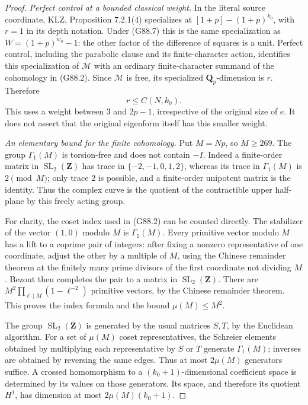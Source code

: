 \begin{proof}
\emph{Perfect control at a bounded classical weight.}
In the literal source coordinate, KLZ, Proposition 7.2.1(4)
specializes at
\([1+p]-(1+p)^{k_0}\), with \(r=1\) in its depth notation.
Under (G88.7) this is the same specialization as
\(W=(1+p)^{w_0}-1\): the other factor of the difference of
squares is a unit. Perfect control, including the parabolic
clause and its finite-character action, identifies this
specialization of \(\mathcal M\) with an ordinary
finite-character summand of the cohomology in (G88.2).
Since \(\mathcal M\) is free, its specialized
\(\mathbf Q_p\)-dimension is \(r\). Therefore
\[
 r\leq C(N,k_0).
 \tag{G88.13}
\]
This uses a weight between \(3\) and \(2p-1\), irrespective of
the original size of \(e\). It does not assert that the
original eigenform itself has this smaller weight.

\emph{An elementary bound for the finite cohomology.}
Put \(M=Np\), so \(M\geq269\).
The group \(\Gamma_1(M)\) is torsion-free and does not contain
\(-I\). Indeed a finite-order matrix in
\(\operatorname{SL}_2(\mathbf Z)\) has trace in
\(\{-2,-1,0,1,2\}\), whereas its trace in \(\Gamma_1(M)\) is
\(2\pmod M\); only trace \(2\) is possible, and a finite-order
unipotent matrix is the identity.
Thus the complex curve is the quotient of the contractible
upper half-plane by this freely acting group.

For clarity, the coset index used in (G88.2) can be counted
directly. The stabilizer of the vector \((1,0)\) modulo \(M\)
is \(\Gamma_1(M)\). Every primitive vector modulo \(M\) has
a lift to a coprime pair of integers: after fixing a nonzero
representative of one coordinate, adjust the other by a
multiple of \(M\), using the Chinese remainder theorem at the
finitely many prime divisors of the first coordinate not
dividing \(M\). Bezout then completes the pair to a matrix
in \(\operatorname{SL}_2(\mathbf Z)\).
There are \(M^2\prod_{\ell\mid M}(1-\ell^{-2})\) primitive
vectors, by the Chinese remainder theorem. This proves the
index formula and the bound \(\mu(M)\leq M^2\).

The group \(\operatorname{SL}_2(\mathbf Z)\) is generated by
the usual matrices \(S,T\), by the Euclidean algorithm.
For a set of \(\mu(M)\) coset representatives, the Schreier
elements obtained by multiplying each representative by
\(S\) or \(T\) generate \(\Gamma_1(M)\); inverses are obtained
by reversing the same edges. Thus at most \(2\mu(M)\)
generators suffice. A crossed homomorphism to a
\((k_0+1)\)-dimensional coefficient space is determined by
its values on those generators. Its space, and therefore
its quotient \(H^1\), has dimension at most
\(2\mu(M)(k_0+1)\).


\end{proof}
